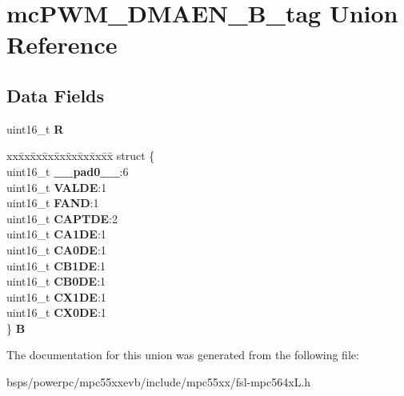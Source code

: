\hypertarget{unionmcPWM__DMAEN__16B__tag}{}\section{mc\+P\+W\+M\+\_\+\+D\+M\+A\+E\+N\+\_\+B\+\_\+tag Union Reference}
\label{unionmcPWM__DMAEN__16B__tag}
\subsection*{Data Fields}
\begin{DoxyCompactItemize}
\item 
\mbox{\label{unionmcPWM__DMAEN__16B__tag_aa7268d2cb15d3ff79aa9b3906b9a470d}} 
uint16\+\_\+t {\bfseries R}
\item 
\mbox{\label{unionmcPWM__DMAEN__16B__tag_a19d104ea2d475c85fc88f6b627e99166}} 
\begin{tabbing}
xx\=xx\=xx\=xx\=xx\=xx\=xx\=xx\=xx\=\kill
struct \{\\
\>uint16\_t {\bfseries \_\_pad0\_\_}:6\\
\>uint16\_t {\bfseries VALDE}:1\\
\>uint16\_t {\bfseries FAND}:1\\
\>uint16\_t {\bfseries CAPTDE}:2\\
\>uint16\_t {\bfseries CA1DE}:1\\
\>uint16\_t {\bfseries CA0DE}:1\\
\>uint16\_t {\bfseries CB1DE}:1\\
\>uint16\_t {\bfseries CB0DE}:1\\
\>uint16\_t {\bfseries CX1DE}:1\\
\>uint16\_t {\bfseries CX0DE}:1\\
\} {\bfseries B}\\

\end{tabbing}\end{DoxyCompactItemize}


The documentation for this union was generated from the following file\+:\begin{DoxyCompactItemize}
\item 
bsps/powerpc/mpc55xxevb/include/mpc55xx/fsl-\/mpc564x\+L.\+h\end{DoxyCompactItemize}
